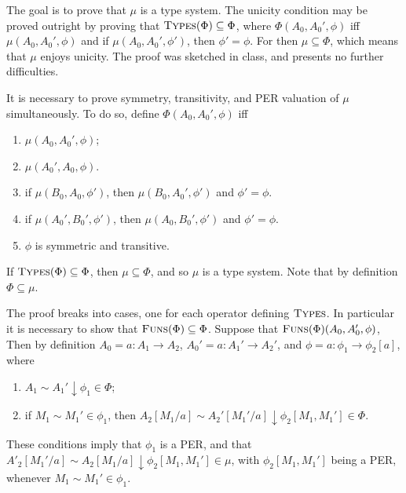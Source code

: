 \documentclass[11pt,twoside]{article}
\newcommand{\DFun}[3]{{#2}{:}{#1}\to{#3}}
\begin{document}
The goal is to prove that $\mu$ is a type system.  The unicity condition may be proved
outright by proving that $\textsc{Types}(\Phi)\subseteq\Phi$, where
$\Phi(A_{0},A_{0}',\phi)$ iff $\mu(A_{0},A_{0}',\phi)$ and if $\mu(A_{0},A_{0}',\phi')$, then
$\phi'=\phi$.  For then $\mu\subseteq\Phi$, which means that $\mu$ enjoys unicity.  The proof was sketched in
class, and presents no further difficulties.

It is necessary to prove symmetry, transitivity, and PER valuation of $\mu$ simultaneously.
To do so, define $\Phi(A_{0},A_{0}',\phi)$ iff
\begin{enumerate}
\item $\mu(A_{0},A_{0}',\phi)$;
\item $\mu(A_{0}',A_{0},\phi)$.
\item if $\mu(B_0,A_0,\phi')$, then $\mu(B_{0},A_{0}',\phi')$ and $\phi'=\phi$.
\item if $\mu(A_{0}',B_{0}',\phi')$, then $\mu(A_{0},B_{0}',\phi')$ and $\phi'=\phi$.
\item $\phi$ is symmetric and transitive.
\end{enumerate}
If $\textsc{Types}(\Phi)\subseteq\Phi$, then $\mu\subseteq\Phi$, and so $\mu$ is a type system.  Note that by
definition $\Phi\subseteq\mu$.

\bigskip

The proof breaks into cases, one for each operator defining $\textsc{Types}$.  In
particular it is necessary to show that $\textsc{Funs}(\Phi)\subseteq\Phi$.  Suppose that
$\textsc{Funs}(\Phi)(A_{0},A_{0}',\phi)$, Then by definition
$A_{0}=\DFun{A_{1}}{a}{A_{2}}$, $A_{0}'=\DFun{A_{1}'}{a}{A_{2}'}$, and
$\phi=\DFun{\phi_{1}}{a}{\phi_{2}[a]}$, where
\begin{enumerate}
\item $A_{1}\sim A_{1}'\downarrow\phi_{1}\in\Phi$;
\item if $M_1\sim M_1'\in\phi_{1}$, then $A_{2}[M_1/a]\sim A_{2}'[M_1'/a]\downarrow\phi_{2}[M_1,M_1']\in\Phi$.
\end{enumerate}
These conditions imply that $\phi_{1}$ is a PER, and that
$A'_{2}[M_1'/a]\sim A_{2}[M_1/a]\downarrow \phi_{2}[M_1,M_1']\in\mu$, with $\phi_{2}[M_1,M_1']$ being a PER, whenever
$M_1\sim M_1'\in\phi_{1}$.
\end{document}
